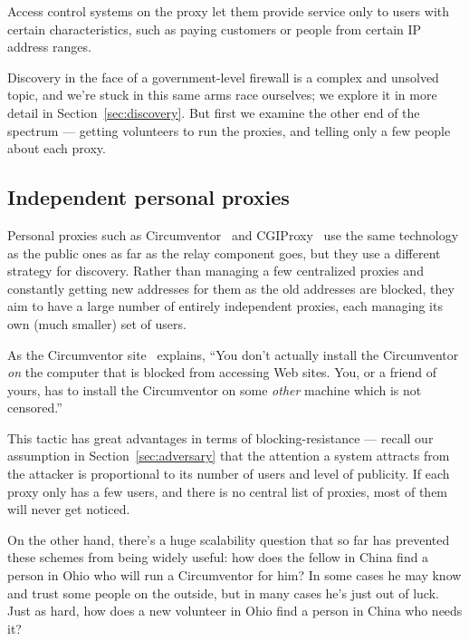 \documentclass{llncs}
\begin{document}
Access control systems on the proxy let them provide service only to
users with certain characteristics, such as paying customers or people
from certain IP address ranges.

Discovery in the face of a government-level firewall is a complex and
unsolved
topic, and we're stuck in this same arms race ourselves; we explore it
in more detail in Section~\ref{sec:discovery}. But first we examine the
other end of the spectrum --- getting volunteers to run the proxies,
and telling only a few people about each proxy.

\subsection{Independent personal proxies}

Personal proxies such as Circumventor~\cite{circumventor} and
CGIProxy~\cite{cgiproxy} use the same technology as the public ones as
far as the relay component goes, but they use a different strategy for
discovery. Rather than managing a few centralized proxies and constantly
getting new addresses for them as the old addresses are blocked, they
aim to have a large number of entirely independent proxies, each managing
its own (much smaller) set of users.

As the Circumventor site~\cite{circumventor} explains, ``You don't
actually install the Circumventor \emph{on} the computer that is blocked
from accessing Web sites. You, or a friend of yours, has to install the
Circumventor on some \emph{other} machine which is not censored.''

This tactic has great advantages in terms of blocking-resistance ---
recall our assumption in Section~\ref{sec:adversary} that the attention
a system attracts from the attacker is proportional to its number of
users and level of publicity. If each proxy only has a few users, and
there is no central list of proxies, most of them will never get noticed.

On the other hand, there's a huge scalability question that so far has
prevented these schemes from being widely useful: how does the fellow
in China find a person in Ohio who will run a Circumventor for him? In
some cases he may know and trust some people on the outside, but in many
cases he's just out of luck. Just as hard, how does a new volunteer in
Ohio find a person in China who needs it?

\end{document}
